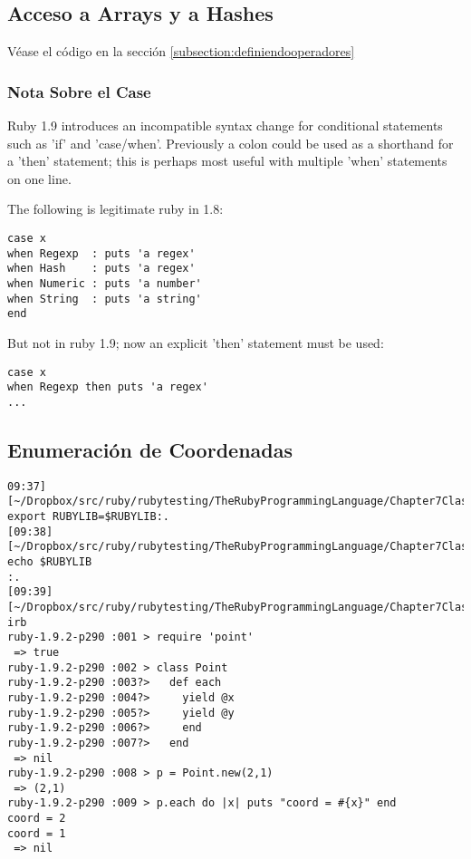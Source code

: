 \subsection{Acceso a Arrays y a Hashes}
Véase  el código en la sección
\ref{subsection:definiendooperadores}

\subsubsection{Nota Sobre el Case}
Ruby 1.9 introduces an incompatible syntax change for conditional statements such as 'if' and 'case/when'. Previously a colon could be used as a shorthand for a 'then' statement; this is perhaps most useful with multiple 'when' statements on one line.

The following is legitimate ruby in 1.8:

\begin{verbatim}
case x 
when Regexp  : puts 'a regex'
when Hash    : puts 'a regex'
when Numeric : puts 'a number'
when String  : puts 'a string'
end
\end{verbatim}
But not in ruby 1.9; now an explicit 'then' statement must be used:

\begin{verbatim}
case x
when Regexp then puts 'a regex'
...
\end{verbatim}

\subsection{Enumeración de Coordenadas}

\begin{verbatim}
09:37][~/Dropbox/src/ruby/rubytesting/TheRubyProgrammingLanguage/Chapter7ClassesAndModules/point]$ export RUBYLIB=$RUBYLIB:.
[09:38][~/Dropbox/src/ruby/rubytesting/TheRubyProgrammingLanguage/Chapter7ClassesAndModules/point]$ echo $RUBYLIB
:.
[09:39][~/Dropbox/src/ruby/rubytesting/TheRubyProgrammingLanguage/Chapter7ClassesAndModules/point]$ irb
ruby-1.9.2-p290 :001 > require 'point' 
 => true 
ruby-1.9.2-p290 :002 > class Point
ruby-1.9.2-p290 :003?>   def each
ruby-1.9.2-p290 :004?>     yield @x
ruby-1.9.2-p290 :005?>     yield @y
ruby-1.9.2-p290 :006?>     end
ruby-1.9.2-p290 :007?>   end
 => nil 
ruby-1.9.2-p290 :008 > p = Point.new(2,1)
 => (2,1) 
ruby-1.9.2-p290 :009 > p.each do |x| puts "coord = #{x}" end
coord = 2
coord = 1
 => nil 

\end{verbatim}

